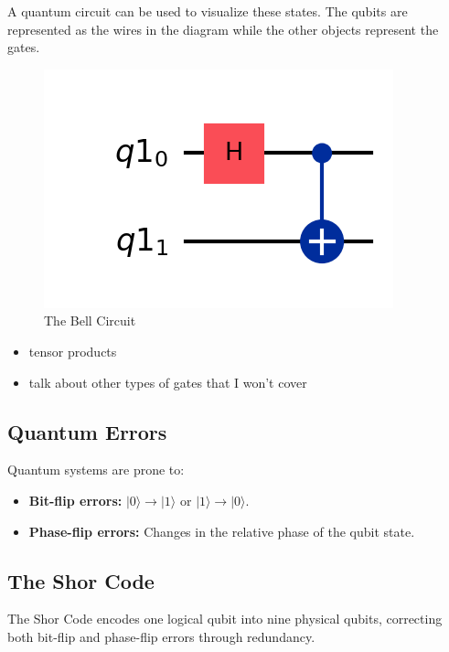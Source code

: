 \documentclass[10pt]{article}
\begin{document}
\begin{multicols}{2}
A quantum circuit can be used to visualize these states. The qubits are represented as the wires in the diagram while the other objects represent the gates. 
\begin{figure}[H]
    \centering
    \includegraphics[width=\columnwidth]{figures/qc.png} %
    \caption{The Bell Circuit}
    \label{fig:no_error}
\end{figure}

\begin{itemize}
    \item tensor products
    \item talk about other types of gates that I won't cover
\end{itemize}

\subsection*{Quantum Errors}
Quantum systems are prone to:
\begin{itemize}
    \item \textbf{Bit-flip errors:} \( |0\rangle \to |1\rangle \) or \( |1\rangle \to |0\rangle \).
    \item \textbf{Phase-flip errors:} Changes in the relative phase of the qubit state.
\end{itemize}

\subsection*{The Shor Code}
The Shor Code encodes one logical qubit into nine physical qubits, correcting both bit-flip and phase-flip errors through redundancy.


\end{multicols}
\end{document}
